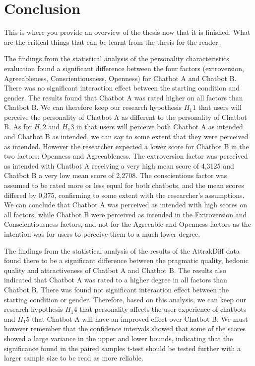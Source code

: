 \chapter{Conclusion}
\label{chap:conclusion}

This is where you provide an overview of the thesis now that it is finished.  What are the critical things that can be learnt from the thesis for the reader.

The findings from the statistical analysis of the personality characteristics evaluation found a significant difference between the four factors (extroversion, Agreeableness, Conscientiousness, Openness) for Chatbot A and Chatbot B. There was no significant interaction effect between the starting condition and gender. The results found that Chatbot A was rated higher on all factors than Chatbot B. We can therefore keep our research hypothesis $H_1 1$ that users will perceive the personality of Chatbot A as different to the personality of Chatbot B. As for $H_1 2$ and $H_1 3$ in that users will perceive both Chatbot A as intended and Chatbot B as intended, we can say to some extent that they were perceived as intended. However the researcher expected a lower score for Chatbot B in the two factors: Openness and Agreeableness. The extroversion factor was perceived as intended with Chatbot A receiving a very high mean score of 4,3125 and Chatbot B a very low mean score of 2,2708. The conscientious factor was assumed to be rated more or less equal for both chatbots, and the mean scores differed by 0,375, confirming to some extent with the researcher's assumptions. We can conclude that Chatbot A was perceived as intended with high scores on all factors, while Chatbot B were perceived as intended in the Extroversion and Conscientiousness factors, and not for the Agreeable and Openness factors as the intention was for users to perceive them to a much lower degree. 

The findings from the statistical analysis of the results of the AttrakDiff data found there to be a significant difference between the pragmatic quality, hedonic quality and attractiveness of Chatbot A and Chatbot B. The results also indicated that Chatbot A was rated to a higher degree in all factors than Chatbot B. There was found not significant interaction effect between the starting condition or gender. Therefore, based on this analysis, we can keep our research hypothesis $H_1 4$ that personality affects the user experience of chatbots and $H_1 5$ that Chatbot A will have an improved effect over Chatbot B. We must however remember that the confidence intervals showed that some of the scores showed a large variance in the upper and lower bounds, indicating that the significance found in the paired samples t-test should be tested further with a larger sample size to be read as more reliable.

